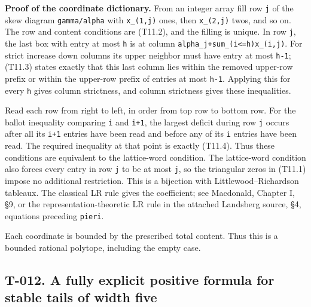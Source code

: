 \documentclass[
  10pt,
]{article}
\begin{document}
\textbf{Proof of the coordinate dictionary.} From an integer array fill
row \texttt{\small j} of the skew diagram
\texttt{\small gamma/\allowbreak{}alpha} with
\texttt{\small x\_\allowbreak{}(\allowbreak{}1,\allowbreak{}j)\allowbreak{}}
ones, then
\texttt{\small x\_\allowbreak{}(\allowbreak{}2,\allowbreak{}j)\allowbreak{}}
twos, and so on. The row and content conditions are (T11.2), and the
filling is unique. In row \texttt{\small j}, the last box with entry at
most \texttt{\small h} is at column
\texttt{\small alpha\_\allowbreak{}j+\allowbreak{}sum\_\allowbreak{}(\allowbreak{}i<=\allowbreak{}h)\allowbreak{}x\_\allowbreak{}(\allowbreak{}i,\allowbreak{}j)\allowbreak{}}.
For strict increase down columns its upper neighbor must have entry at
most \texttt{\small h-\allowbreak{}1}; (T11.3) states exactly that this
last column lies within the removed upper-row prefix or within the
upper-row prefix of entries at most \texttt{\small h-\allowbreak{}1}.
Applying this for every \texttt{\small h} gives column strictness, and
column strictness gives these inequalities.

Read each row from right to left, in order from top row to bottom row.
For the ballot inequality comparing \texttt{\small i} and
\texttt{\small i+\allowbreak{}1}, the largest deficit during row
\texttt{\small j} occurs after all its \texttt{\small i+\allowbreak{}1}
entries have been read and before any of its \texttt{\small i} entries
have been read. The required inequality at that point is exactly
(T11.4). Thus these conditions are equivalent to the lattice-word
condition. The lattice-word condition also forces every entry in row
\texttt{\small j} to be at most \texttt{\small j}, so the triangular
zeros in (T11.1) impose no additional restriction. This is a bijection
with Littlewood--Richardson tableaux. The classical LR rule gives the
coefficient; see Macdonald, Chapter I, §9, or the
representation-theoretic LR rule in the attached Landsberg source, §4,
equations preceding \texttt{\small pieri}.

Each coordinate is bounded by the prescribed total content. Thus this is
a bounded rational polytope, including the empty case.

\subsection{T-012. A fully explicit positive formula for stable tails of
width
five}\label{t-012.-a-fully-explicit-positive-formula-for-stable-tails-of-width-five}
\end{document}
